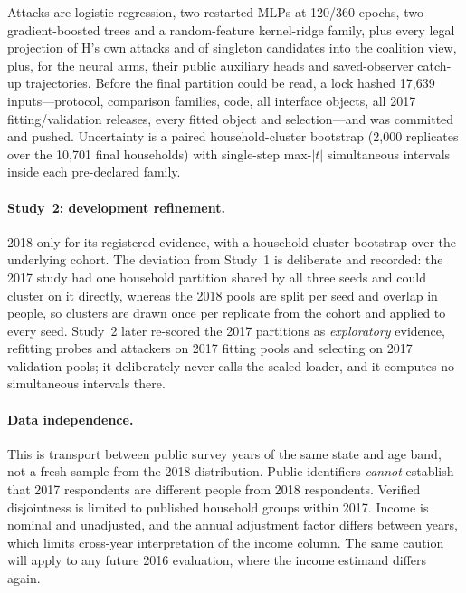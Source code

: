 \documentclass[10pt]{article}
\begin{document}
Attacks are logistic regression, two restarted MLPs at 120/360 epochs, two gradient-boosted trees
and a random-feature kernel-ridge family, plus every legal projection of H's own attacks and of
singleton candidates into the coalition view, plus, for the neural arms, their public auxiliary
heads and saved-observer catch-up trajectories. Before the final partition could be read, a lock
hashed 17{,}639 inputs---protocol, comparison families, code, all interface objects, all 2017
fitting/validation releases, every fitted object and selection---and was committed and pushed.
Uncertainty is a paired household-cluster bootstrap (2{,}000 replicates over the 10{,}701 final
households) with single-step max-$|t|$ simultaneous intervals inside each pre-declared family.

\paragraph{Study~2: development refinement.} 2018 only for its registered evidence, with a
household-cluster bootstrap over the underlying cohort. The deviation from Study~1 is deliberate
and recorded: the 2017 study had one household partition shared by all three seeds and could
cluster on it directly, whereas the 2018 pools are split per seed and overlap in people, so
clusters are drawn once per replicate from the cohort and applied to every seed. Study~2 later
re-scored the 2017 partitions as \emph{exploratory} evidence, refitting probes and attackers on
2017 fitting pools and selecting on 2017 validation pools; it deliberately never calls the sealed
loader, and it computes no simultaneous intervals there.

\paragraph{Data independence.} This is transport between public survey years of the same state and
age band, not a fresh sample from the 2018 distribution. Public identifiers \emph{cannot} establish
that 2017 respondents are different people from 2018 respondents. Verified disjointness is limited
to published household groups within 2017. Income is nominal and unadjusted, and the annual
adjustment factor differs between years, which limits cross-year interpretation of the income
column. The same caution will apply to any future 2016 evaluation, where the income estimand
differs again.
\end{document}
